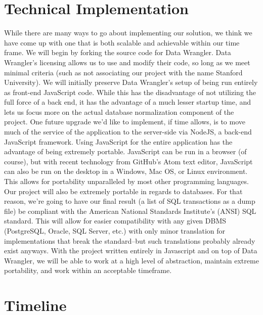 \documentclass{../sty/acm_proc_article-sp}
\begin{document}
\section{Technical Implementation}
While there are many ways to go about implementing our solution, we think we have come up with one that is both scalable and achievable within our time frame.
We will begin by forking the source code for Data Wrangler. Data Wrangler's licensing allows us to use and modify their code, so long as we meet minimal criteria (such as not associating our project with the name Stanford University).
We will initially preserve Data Wrangler's setup of being run entirely as front-end JavaScript code. While this has the disadvantage of not utilizing the full force of a back end, it has the advantage of a much lesser startup time, and lets us focus more on the actual database normalization component of the project. One future upgrade we'd like to implement, if time allows, is to move much of the service of the application to the server-side via NodeJS, a back-end JavaScript framework.
Using JavaScript for the entire application has the advantage of being extremely portable. JavaScript can be run in a browser (of course), but with recent technology from GitHub's Atom text editor, JavaScript can also be run on the desktop in a Windows, Mac OS, or Linux environment. This allows for portability unparalleled by most other programming languages.
Our project will also be extremely portable in regards to databases. For that reason, we're going to have our final result (a list of SQL transactions as a dump file) be compliant with the American National Standards Institute's (ANSI) SQL standard. This will allow for easier compatibility with any given DBMS (PostgreSQL, Oracle, SQL Server, etc.) with only minor translation for implementations that break the standard--but such translations probably already exist anyways.
With the project written entirely in Javascript and on top of Data Wrangler, we will be able to work at a high level of abstraction, maintain extreme portability, and work within an acceptable timeframe.


\section{Timeline}
\end{document}
